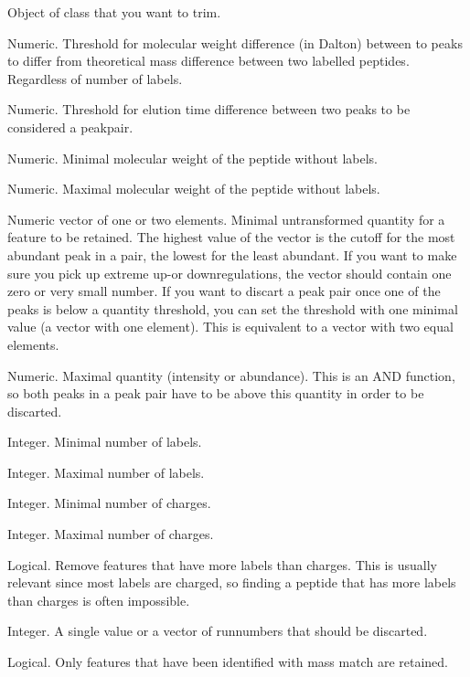 \documentclass[letterpaper]{book}
\begin{document}
\begin{Arguments}
\begin{ldescription}
\item[\code{pepmatched\_object}] Object of class  that you want to trim.

\item[\code{labelthresh}] Numeric. Threshold for molecular weight difference (in Dalton) between to peaks to differ from theoretical mass difference between two labelled peptides. Regardless of number of labels.

\item[\code{elutionthresh}] Numeric. Threshold for elution time difference between two peaks to be considered a peakpair.

\item[\code{MWmin}] Numeric. Minimal molecular weight of the peptide without labels.

\item[\code{MWmax}] Numeric. Maximal molecular weight of the peptide without labels.

\item[\code{quantmin}] Numeric vector of one or two elements. Minimal untransformed quantity for a feature to be retained. The highest value of the vector is the cutoff for the most abundant peak in a pair, the lowest for the least abundant. If you want to make sure you pick up extreme up-or downregulations, the vector should contain one zero or very small number. If you want to discart a peak pair once one of the peaks is below a quantity threshold, you can set the threshold with one minimal value (a vector with one element). This is equivalent to a vector with two equal elements.

\item[\code{quantmax}] Numeric. Maximal quantity (intensity or abundance). This is an AND function, so both peaks in a peak pair have to be above this quantity in order to be discarted.

\item[\code{labelcountmin}] Integer. Minimal number of labels.

\item[\code{labelcountmax}] Integer. Maximal number of labels.

\item[\code{zmin}] Integer. Minimal number of charges.

\item[\code{zmax}] Integer. Maximal number of charges.

\item[\code{remove.more.labels.than.charges}] Logical. Remove features that have more labels than charges. This is usually relevant since most labels are charged, so finding a peptide that has more labels than charges is often impossible.

\item[\code{remove.run}] Integer. A single value or a vector of runnumbers that should be discarted.

\item[\code{only.identified}] Logical. Only features that have been identified with mass match are retained.
\end{ldescription}
\end{Arguments}
\end{document}
